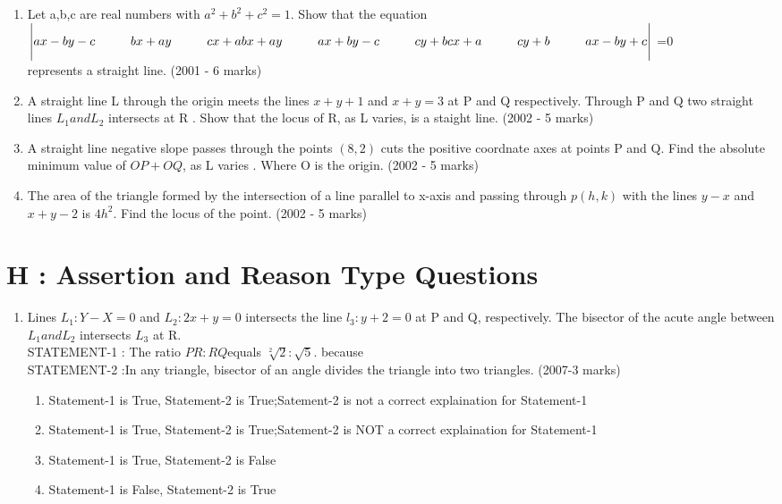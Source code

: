 \documentclass[12pt]{article}
\begin{document}
\begin{enumerate}
\item Let a,b,c are real numbers with $a^2+b^2+c^2=1$. Show that the equation\\ 
$\Bigg |ax-by-c\hspace{1cm}bx+ay\hspace{1cm} cx+a\\
bx+ay  \hspace{1cm}ax+by-c  \hspace{1cm}cy+b\\
cx+a   \hspace{1cm} cy+b  \hspace{1cm}  ax-by+c\Bigg |$ =0\\
represents a straight line. (2001 - 6 marks) \\
\item A straight line L through the origin meets the lines $x+y+1$ and $x+y=3$ at P and Q respectively. Through  P and Q two straight lines $L_1 and L_2$ intersects at R . Show that the locus of R, as L varies, is a staight line. (2002 - 5 marks)\\
\item A straight line negative slope passes through the points $(8,2)$ cuts the positive 
coordnate axes at points P and Q. Find the absolute minimum value of $OP+OQ$, as L varies . Where O is the origin. (2002 - 5 marks)\\
\item The area of the triangle formed by the intersection of a line parallel to x-axis and passing through $p(h,k)$ with the lines $y-x$ and $x+y-2$ is $4h^2$. Find the locus of the point. (2002 - 5 marks)\\
\end{enumerate}

\section*{H   : Assertion and Reason Type Questions}

\begin{enumerate}
\item Lines $L_1: Y-X=0$ and $L_2 :2x+y=0$ intersects the line $l_3:y+2=0$ at P and Q, respectively. The bisector of the acute angle between $L_1 and L_2$ intersects $L_3$ at R.\\
STATEMENT-1 : The ratio $PR:RQ$equals $\sqrt[2]{2}:\sqrt{5}$. because \\
STATEMENT-2 :In any triangle, bisector of an angle divides the triangle into two triangles. (2007-3 marks)
\begin{enumerate}
\item Statement-1 is True, Statement-2 is True;Satement-2 is not a correct explaination for Statement-1
\item Statement-1 is True, Statement-2 is True;Satement-2 is NOT a correct explaination for Statement-1
\item Statement-1 is True, Statement-2 is False
\item Statement-1 is False, Statement-2 is True
\end{enumerate}
\end{enumerate}
\end{document}
